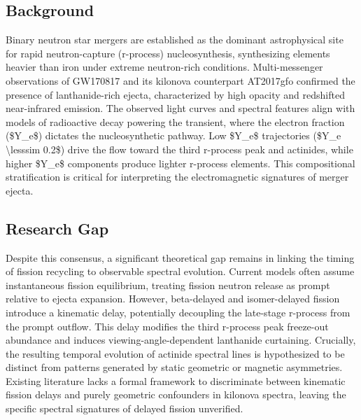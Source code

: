 \documentclass[conference]{IEEEtran}
\begin{document}
\subsection{Background}
Binary neutron star mergers are established as the dominant astrophysical site for rapid neutron-capture (r-process) nucleosynthesis, synthesizing elements heavier than iron under extreme neutron-rich conditions. Multi-messenger observations of GW170817 and its kilonova counterpart AT2017gfo confirmed the presence of lanthanide-rich ejecta, characterized by high opacity and redshifted near-infrared emission. The observed light curves and spectral features align with models of radioactive decay powering the transient, where the electron fraction (\$Y\_e\$) dictates the nucleosynthetic pathway. Low \$Y\_e\$ trajectories (\$Y\_e \textbackslash{}lesssim 0.2\$) drive the flow toward the third r-process peak and actinides, while higher \$Y\_e\$ components produce lighter r-process elements. This compositional stratification is critical for interpreting the electromagnetic signatures of merger ejecta.~\cite{cite_07d6df5d6978a1fc,cite_30c88fe46f23448d,cite_612290131318c0d4}

\subsection{Research Gap}
Despite this consensus, a significant theoretical gap remains in linking the timing of fission recycling to observable spectral evolution. Current models often assume instantaneous fission equilibrium, treating fission neutron release as prompt relative to ejecta expansion. However, beta-delayed and isomer-delayed fission introduce a kinematic delay, potentially decoupling the late-stage r-process from the prompt outflow. This delay modifies the third r-process peak freeze-out abundance and induces viewing-angle-dependent lanthanide curtaining. Crucially, the resulting temporal evolution of actinide spectral lines is hypothesized to be distinct from patterns generated by static geometric or magnetic asymmetries. Existing literature lacks a formal framework to discriminate between kinematic fission delays and purely geometric confounders in kilonova spectra, leaving the specific spectral signatures of delayed fission unverified.~\cite{cite_43194f3b6113c2ab,cite_b668987a568d271f}
\end{document}
